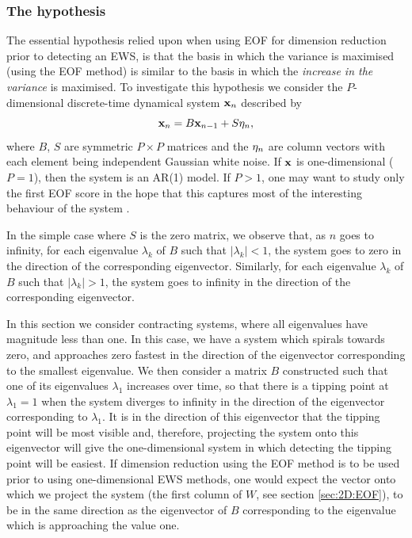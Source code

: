 {}

\subsubsection{The hypothesis}
\label{sub:EOF-hypothesis}
The essential hypothesis relied upon when using EOF for dimension reduction prior to detecting an EWS, is that the basis in which the variance is maximised (using the EOF method) is similar to the basis in which the \emph{increase in the variance} is maximised. To investigate this hypothesis we consider the $P$-dimensional discrete-time dynamical system $\mathbf{x}_n$ described by 
	\begin{equation}
	\mathbf{x}_{n} = B\mathbf{x}_{n-1} + S\mathbf{\eta}_n,
	\label{eqn:EOF-exampleSystem}
	\end{equation}
where $B$, $S$ are symmetric $P\times P$ matrices and the $\mathbf{\eta}_n$ are column vectors with each element being independent Gaussian white noise. If $\mathbf{x}$ is one-dimensional ($P=1$), then the system is an AR(1) model. If $P>1$, one may want to study only the first EOF score in the hope that this captures most of the interesting behaviour of the system \citep{held2004}. 

In the simple case where $S$ is the zero matrix, we observe that, as $n$ goes to infinity, for each eigenvalue $\lambda_k$ of $B$ such that $|\lambda_k|<1$, the system goes to zero in the direction of the corresponding eigenvector. Similarly, for each eigenvalue $\lambda_k$ of $B$ such that $|\lambda_k|>1$, the system goes to infinity in the direction of the corresponding eigenvector. 

In this section we consider contracting systems, where all eigenvalues have magnitude less than one. In this case, we have a system which spirals towards zero, and approaches zero fastest in the direction of the eigenvector corresponding to the smallest eigenvalue. We then consider a matrix $B$ constructed such that one of its eigenvalues $\lambda_1$ increases over time, so that there is a tipping point at $\lambda_1=1$ when the system diverges to infinity in the direction of the eigenvector corresponding to $\lambda_1$. It is in the direction of this eigenvector that the tipping point will be most visible and, therefore, projecting the system onto this eigenvector will give the one-dimensional system in which detecting the tipping point will be easiest. If dimension reduction using the EOF method is to be used prior to using one-dimensional EWS methods, one would expect the vector onto which we project the system (the first column of $W$, see section \ref{sec:2D:EOF}), to be in the same direction as the eigenvector of $B$ corresponding to the eigenvalue which is approaching the value one.

